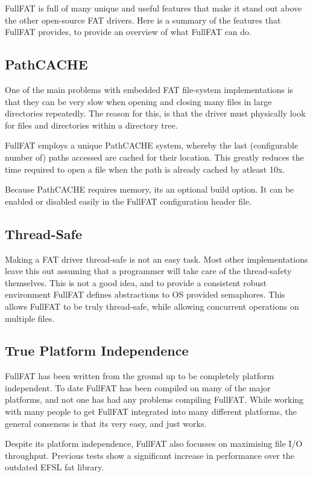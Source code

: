 FullFAT is full of many unique and useful features that make it stand out above the other open-source FAT drivers. Here is a summary of the features that FullFAT provides, to provide an overview of what FullFAT can do.

\subsection{PathCACHE}
One of the main problems with embedded FAT file-system implementations is that they can be very slow when opening and closing many files in large directories repeatedly. The reason for this, is that the driver must physically look for files and directories within a directory tree.

FullFAT employs a unique PathCACHE system, whereby the last (configurable number of) paths accessed are cached for their location. This greatly reduces the time required to open a file when the path is already cached by atleast 10x.

Because PathCACHE requires memory, its an optional build option. It can be enabled or disabled easily in the FullFAT configuration header file.

\subsection{Thread-Safe}
Making a FAT driver thread-safe is not an easy task. Most other implementations leave this out assuming that a programmer will take care of the thread-safety themselves. This is not a good idea, and to provide a consistent robust environment FullFAT defines abstractions to OS provided semaphores. This allows FullFAT to be truly thread-safe, while allowing concurrent operations on multiple files.

\subsection{True Platform Independence}
FullFAT has been written from the ground up to be completely platform independent. To date FullFAT has been compiled on many of the major platforms, and not one has had any problems compiling FullFAT. While working with many people to get FullFAT integrated into many different platforms, the general consensus is that its very easy, and just works.

Despite its platform independence, FullFAT also focusses on maximising file I/O throughput. Previous tests show a significant increase in performance over the outdated EFSL fat library.

